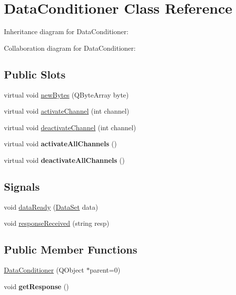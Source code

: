 \hypertarget{classDataConditioner}{\section{Data\+Conditioner Class Reference}
\label{classDataConditioner}
}


Inheritance diagram for Data\+Conditioner\+:


Collaboration diagram for Data\+Conditioner\+:
\subsection*{Public Slots}
\begin{DoxyCompactItemize}
\item 
virtual void \hyperlink{classDataConditioner_a79187835a69de44cf8d104bd972055c8}{new\+Bytes} (Q\+Byte\+Array byte)
\item 
virtual void \hyperlink{classDataConditioner_ac798325df3b24313fa1d9db1904d484f}{activate\+Channel} (int channel)
\item 
virtual void \hyperlink{classDataConditioner_a2539b9cdfd4d6e46a06dbe2a2a038abd}{deactivate\+Channel} (int channel)
\item 
\hypertarget{classDataConditioner_adba5c53fe671c8e95dce70d2b178d9e9}{virtual void {\bfseries activate\+All\+Channels} ()}\label{classDataConditioner_adba5c53fe671c8e95dce70d2b178d9e9}

\item 
\hypertarget{classDataConditioner_a0b90c8af111e957c62bfc2e80f53ce3d}{virtual void {\bfseries deactivate\+All\+Channels} ()}\label{classDataConditioner_a0b90c8af111e957c62bfc2e80f53ce3d}

\end{DoxyCompactItemize}
\subsection*{Signals}
\begin{DoxyCompactItemize}
\item 
void \hyperlink{classDataConditioner_aabc0d8e3f9f549d3ba37846ff5b296eb}{data\+Ready} (\hyperlink{classDataSet}{Data\+Set} data)
\item 
void \hyperlink{classDataConditioner_a527d8428ead1da99018d36f77ea617cc}{response\+Received} (string resp)
\end{DoxyCompactItemize}
\subsection*{Public Member Functions}
\begin{DoxyCompactItemize}
\item 
\hyperlink{classDataConditioner_ac0c2bf7b85c555e743488d49cef1494f}{Data\+Conditioner} (Q\+Object $\ast$parent=0)
\item 
\hypertarget{classDataConditioner_a07dbe2cd939c275dbbce01a0cce23d53}{void {\bfseries get\+Response} ()}\label{classDataConditioner_a07dbe2cd939c275dbbce01a0cce23d53}

\end{DoxyCompactItemize}


